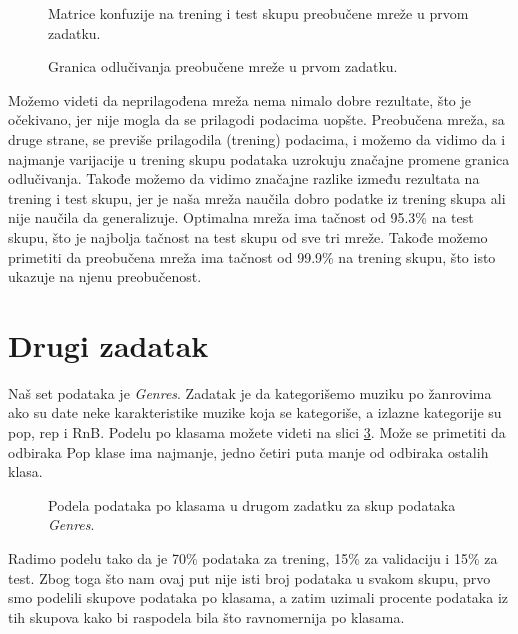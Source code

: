 \documentclass[10pt,a4paper,titlepage,croatian]{article}
\begin{document}
\begin{figure}[H]
    \centering
    
    
    \caption{Matrice konfuzije na trening i test skupu preobučene mreže u prvom zadatku.}
    \label{CM1Overfit}
\end{figure}
\begin{figure}[H]
    \centering
    
    \caption{Granica odlučivanja preobučene mreže u prvom zadatku.}
    \label{GO1Overfit}
\end{figure}

Možemo videti da neprilagođena mreža nema nimalo dobre rezultate, što je očekivano, jer nije mogla da se prilagodi podacima uopšte. Preobučena mreža, sa druge strane, se previše prilagodila (trening) podacima, i možemo da vidimo da i najmanje varijacije u trening skupu podataka uzrokuju značajne promene granica odlučivanja. Takođe možemo da vidimo značajne razlike između rezultata na trening i test skupu, jer je naša mreža naučila dobro podatke iz trening skupa ali nije naučila da generalizuje. Optimalna mreža ima tačnost od 95.3\% na test skupu, što je najbolja tačnost na test skupu od sve tri mreže. Takođe možemo primetiti da preobučena mreža ima tačnost od 99.9\% na trening skupu, što isto ukazuje na njenu preobučenost.

\section{Drugi zadatak}
Naš set podataka je \textit{Genres}. Zadatak je da kategorišemo muziku po žanrovima ako su date neke karakteristike muzike koja se kategoriše, a izlazne kategorije su pop, rep i RnB. Podelu po klasama možete videti na slici \ref{Podela2}. Može se primetiti da odbiraka Pop klase ima najmanje, jedno četiri puta manje od odbiraka ostalih klasa.

\begin{figure}[H]
    \centering
    
    \caption{Podela podataka po klasama u drugom zadatku za skup podataka \textit{Genres}.}
    \label{Podela2}
\end{figure}

Radimo podelu tako da je 70\% podataka za trening, 15\% za validaciju i 15\% za test. Zbog toga što nam ovaj put nije isti broj podataka u svakom skupu, prvo smo podelili skupove podataka po klasama, a zatim uzimali procente podataka iz tih skupova kako bi raspodela bila što ravnomernija po klasama.
\end{document}
